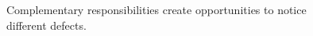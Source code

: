 \begin{figure}[H]
\centering
{}
\caption{Complementary responsibilities create opportunities to notice different defects.}\label{fig:teach-M06-02}
\end{figure}
